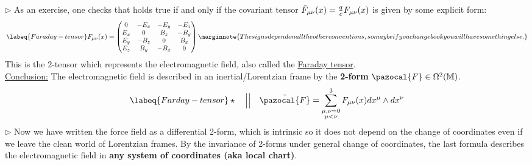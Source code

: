 \documentclass[../main.tex]{subfiles}
\begin{document}
$\triangleright$ As an exercise, one checks that  holds true if and only if the covariant tensor $\Tilde{F}_{\mu\nu}(x)=\frac{q}{c}F_{\mu\nu}(x)$ is given by some explicit form:
\begin{equation}\labeq{Faraday-tensor}
F_{\mu\nu}(x)=\begin{pmatrix}
0 & -E_x & -E_y & -E_z \\
E_x & 0 & B_z & -B_y \\
E_y & -B_z & 0 & B_x \\
E_z & B_y & -B_x & 0
\end{pmatrix}\marginnote{The signs depend on all the other conventions, so maybe if you change book you will have something else.}
\end{equation}
This is the 2-tensor which represents the electromagnetic field, also called the \href{https://it.wikipedia.org/wiki/Tensore_elettromagnetico}{Faraday tensor}.\\
\underline{Conclusion:} The electromagnetic field is described in an inertial/Lorentzian frame by the \textbf{2-form} $\pazocal{F}\in\Omega^2(\mathbb{M})$.
\begin{equation}\labeq{Farday-tensor}
\star \quad \Big| \Big| \quad \Tilde{\pazocal{F}}=\sum_{\substack{\mu,\nu=0\\ \mu<\nu}}^3 {F}_{\mu\nu}(x)dx^{\mu}\wedge dx^{\nu}
\end{equation}
$\triangleright$ Now we have written the force field as a differential 2-form, which is intrinsic so it does not depend on the change of coordinates even if we leave the clean world of Lorentzian frames. By the invariance of 2-forms under general change of coordinates, the last formula  describes the electromagnetic field in \textbf{any system of coordinates (aka local chart)}.
\end{document}
